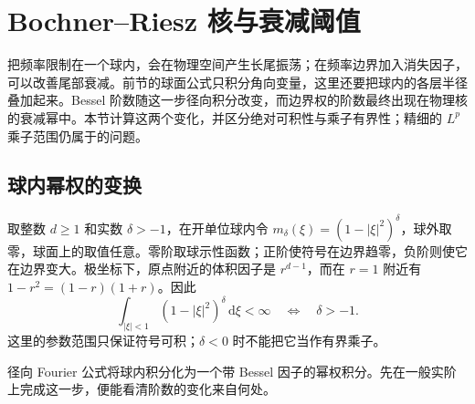 \section{Bochner--Riesz 核与衰减阈值}
\label{b2:sec:A203}

把频率限制在一个球内，会在物理空间产生长尾振荡；在频率边界加入消失因子，可以改善尾部衰减。前节的球面公式只积分角向变量，这里还要把球内的各层半径叠加起来。Bessel 阶数随这一步径向积分改变，而边界权的阶数最终出现在物理核的衰减幂中。本节计算这两个变化，并区分绝对可积性与乘子有界性；精细的 \(L^p\) 乘子范围仍属于的问题。

\subsection{球内幂权的变换}
\label{b2:subsec:A20301}

取整数 \(d\geq1\) 和实数 \(\delta>-1\)，在开单位球内令
\(m_\delta(\xi)=(1-|\xi|^2)^\delta\)，球外取零，球面上的取值任意。零阶取球示性函数；正阶使符号在边界趋零，负阶则使它在边界变大。极坐标下，原点附近的体积因子是 \(r^{d-1}\)，而在 \(r=1\) 附近有 \(1-r^2=(1-r)(1+r)\)。因此
\[
 \int_{|\xi|<1}(1-|\xi|^2)^\delta\,\mathrm d\xi<\infty
 \quad\Longleftrightarrow\quad \delta>-1.
\]
这里的参数范围只保证符号可积；\(\delta<0\) 时不能把它当作有界乘子。

\ProseParagraphBreak

径向 Fourier 公式将球内积分化为一个带 Bessel 因子的幂权积分。先在一般实阶上完成这一步，便能看清阶数的变化来自何处。

